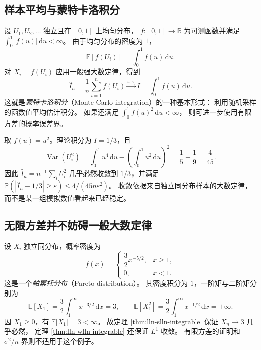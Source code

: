 \documentclass[UTF8,12pt,a4paper,fontset=fandol]{ctexart}
\begin{document}
\subsection{样本平均与蒙特卡洛积分}

设 $U_1,U_2,\ldots$ 独立且在 $[0,1]$ 上均匀分布，
$f:[0,1]\to\mathbb R$ 为可测函数并满足 $\int_0^1|f(u)|\,\mathrm du<\infty$。
由于均匀分布的密度为 $1$，
\[
  \mathbb E[f(U_i)]=\int_0^1 f(u)\,\mathrm du.
\]
对 $X_i=f(U_i)$ 应用一般强大数定律，得到
\begin{equation}
  \widehat I_n=\frac1n\sum_{i=1}^nf(U_i)
  \xrightarrow{\mathrm{a.s.}}
  I=\int_0^1 f(u)\,\mathrm du.
  \label{eq:lln-monte-carlo}
\end{equation}
这就是\emph{蒙特卡洛积分}（Monte Carlo integration）的一种基本形式：
利用随机采样的函数值平均估计积分。
如果还满足 $\int_0^1f(u)^2\,\mathrm du<\infty$，
则可进一步使用有限方差的概率误差界。

\begin{example}[估计平方函数的积分]
取 $f(u)=u^2$。理论积分为 $I=1/3$，且
\[
  \operatorname{Var}(U_i^2)
  =\int_0^1u^4\,\mathrm du
   -\left(\int_0^1u^2\,\mathrm du\right)^2
  =\frac15-\frac19=\frac4{45}.
\]
因此 $\widehat I_n=n^{-1}\sum_iU_i^2$ 几乎必然收敛到 $1/3$，并满足
$\mathbb P(|\widehat I_n-1/3|\geq\varepsilon)
\leq4/(45n\varepsilon^2)$。
收敛依据来自独立同分布样本的大数定律，而不是某一组模拟数值看起来已经稳定。
\end{example}

\subsection{无限方差并不妨碍一般大数定律}

\begin{example}
\label{ex:lln-infinite-variance}
设 $X_i$ 独立同分布，概率密度为
\[
  f(x)=
  \begin{cases}
    \dfrac32x^{-5/2},&x\geq1,\\
    0,&x<1.
  \end{cases}
\]
这是一个\emph{帕累托分布}（Pareto distribution）。
其密度积分为 $1$，一阶矩与二阶矩分别为
\[
  \mathbb E[X_1]
  =\frac32\int_1^\infty x^{-3/2}\,\mathrm dx=3,
  \qquad
  \mathbb E[X_1^2]
  =\frac32\int_1^\infty x^{-1/2}\,\mathrm dx=+\infty.
\]
因 $X_1\geq0$，有 $\mathbb E|X_1|=3<\infty$。
故定理 \ref{thm:lln-slln-integrable} 保证 $\overline X_n\to3$ 几乎必然，
定理 \ref{thm:lln-wlln-integrable} 还保证 $L^1$ 收敛。
有限方差的证明和 $\sigma^2/n$ 界则不适用于这个例子。
\end{example}
\end{document}
